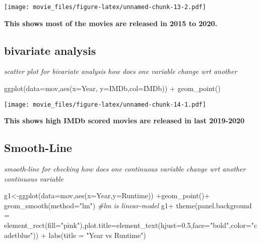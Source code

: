 \documentclass[
]{article}
\newenvironment{Shaded}{\begin{snugshade}}{\end{snugshade}}
\newcommand{\AttributeTok}[1]{\textcolor[rgb]{0.77,0.63,0.00}{#1}}
\newcommand{\CommentTok}[1]{\textcolor[rgb]{0.56,0.35,0.01}{\textit{#1}}}
\newcommand{\FloatTok}[1]{\textcolor[rgb]{0.00,0.00,0.81}{#1}}
\newcommand{\FunctionTok}[1]{\textcolor[rgb]{0.00,0.00,0.00}{#1}}
\newcommand{\NormalTok}[1]{#1}
\newcommand{\OtherTok}[1]{\textcolor[rgb]{0.56,0.35,0.01}{#1}}
\newcommand{\SpecialCharTok}[1]{\textcolor[rgb]{0.00,0.00,0.00}{#1}}
\newcommand{\StringTok}[1]{\textcolor[rgb]{0.31,0.60,0.02}{#1}}
\begin{document}
\texttt{[image: movie\_files/figure-latex/unnamed-chunk-13-2.pdf]}

\textbf{This shows most of the movies are released in 2015 to 2020.}

\hypertarget{bi}{%
\subsection{bivariate analysis}\label{bi}}

\emph{scatter plot for bivariate analysis how does one variable change
wrt another}

\begin{Shaded}
\begin{Highlighting}[]
\FunctionTok{ggplot}\NormalTok{(}\AttributeTok{data=}\NormalTok{mov,}\FunctionTok{aes}\NormalTok{(}\AttributeTok{x=}\NormalTok{Year, }\AttributeTok{y=}\NormalTok{IMDb,}\AttributeTok{col=}\NormalTok{IMDb)) }\SpecialCharTok{+} \FunctionTok{geom\_point}\NormalTok{()}
\end{Highlighting}
\end{Shaded}

\texttt{[image: movie\_files/figure-latex/unnamed-chunk-14-1.pdf]}

\textbf{This shows high IMDb scored movies are released in last
2019-2020}

\hypertarget{smooth}{%
\subsection{Smooth-Line}\label{smooth}}

\emph{smooth-line for checking how does one continuous variable change
wrt another continuous variable}

\begin{Shaded}
\begin{Highlighting}[]
\NormalTok{  g1}\OtherTok{\textless{}{-}}\FunctionTok{ggplot}\NormalTok{(}\AttributeTok{data=}\NormalTok{mov,}\FunctionTok{aes}\NormalTok{(}\AttributeTok{x=}\NormalTok{Year,}\AttributeTok{y=}\NormalTok{Runtime)) }\SpecialCharTok{+}\FunctionTok{geom\_point}\NormalTok{()}\SpecialCharTok{+} \FunctionTok{geom\_smooth}\NormalTok{(}\AttributeTok{method=}\StringTok{"lm"}\NormalTok{) }\CommentTok{\#lm is linear{-}model}
\NormalTok{  g1}\SpecialCharTok{+} \FunctionTok{theme}\NormalTok{(}\AttributeTok{panel.background =} \FunctionTok{element\_rect}\NormalTok{(}\AttributeTok{fill=}\StringTok{"pink"}\NormalTok{),}\AttributeTok{plot.title=}\FunctionTok{element\_text}\NormalTok{(}\AttributeTok{hjust=}\FloatTok{0.5}\NormalTok{,}\AttributeTok{face=}\StringTok{"bold"}\NormalTok{,}\AttributeTok{color=}\StringTok{"cadetblue"}\NormalTok{)) }\SpecialCharTok{+} \FunctionTok{labs}\NormalTok{(}\AttributeTok{title =} \StringTok{"Year vs Runtime"}\NormalTok{)}
\end{Highlighting}
\end{Shaded}
\end{document}
